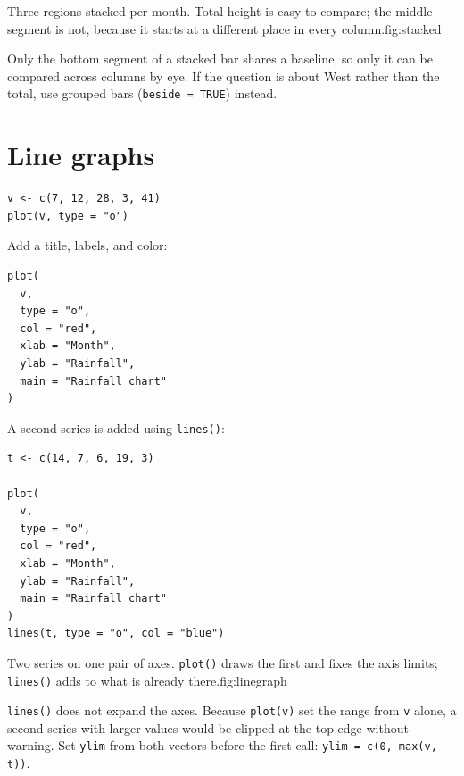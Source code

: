 \begin{utpfig}{Three regions stacked per month. Total height
is easy to compare; the middle segment is not, because it starts at a different
place in every column.}{fig:stacked}

\end{utpfig}

\begin{pitfall}
Only the bottom segment of a stacked bar shares a baseline, so only it can be
compared across columns by eye. If the question is about West rather than the
total, use grouped bars (\texttt{beside = TRUE}) instead.
\end{pitfall}

\section{Line graphs}

\begin{lstlisting}[style=dsr]
v <- c(7, 12, 28, 3, 41)
plot(v, type = "o")
\end{lstlisting}

Add a title, labels, and color:

\begin{lstlisting}[style=dsr]
plot(
  v,
  type = "o",
  col = "red",
  xlab = "Month",
  ylab = "Rainfall",
  main = "Rainfall chart"
)
\end{lstlisting}

A second series is added using \texttt{lines()}:

\begin{lstlisting}[style=dsr]
t <- c(14, 7, 6, 19, 3)

plot(
  v,
  type = "o",
  col = "red",
  xlab = "Month",
  ylab = "Rainfall",
  main = "Rainfall chart"
)
lines(t, type = "o", col = "blue")
\end{lstlisting}

\begin{utpfig}{Two series on one pair of axes. \texttt{plot()} draws
the first and fixes the axis limits; \texttt{lines()} adds to what is already
there.}{fig:linegraph}

\end{utpfig}

\begin{pitfall}
\texttt{lines()} does not expand the axes. Because \texttt{plot(v)} set the
range from \texttt{v} alone, a second series with larger values would be
clipped at the top edge without warning. Set \texttt{ylim} from both vectors
before the first call: \texttt{ylim = c(0, max(v, t))}.
\end{pitfall}

